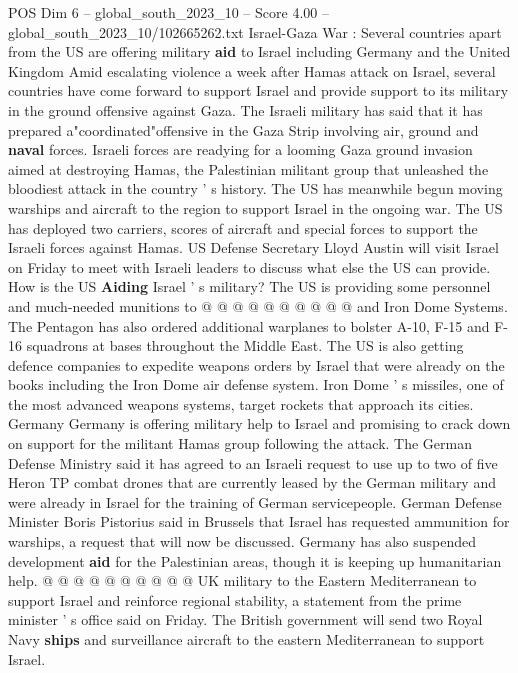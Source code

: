 \begin{textsample}{POS Dim 6 – global\_south\_2023\_10 – Score 4.00 – global\_south\_2023\_10/102665262.txt}  \label{ex:f6_pos_294}
Israel-Gaza War : Several countries apart from the US are offering military \textbf{aid} to Israel including Germany and the United Kingdom Amid escalating violence a week after Hamas attack on Israel, several countries have come forward to support Israel and provide support to its military in the ground offensive against Gaza.
The Israeli military has said that it has prepared a"coordinated"offensive in the Gaza Strip involving air, ground and \textbf{naval} forces.
Israeli forces are readying for a looming Gaza ground invasion aimed at destroying Hamas, the Palestinian militant group that unleashed the bloodiest attack in the country ' s history.
The US has meanwhile begun moving warships and aircraft to the region to support Israel in the ongoing war.
The US has deployed two carriers, scores of aircraft and special forces to support the Israeli forces against Hamas.
US Defense Secretary Lloyd Austin will visit Israel on Friday to meet with Israeli leaders to discuss what else the US can provide.
How is the US \textbf{Aiding} Israel ' s military?
The US is providing some personnel and much-needed munitions to @ @ @ @ @ @ @ @ @ @ and Iron Dome Systems.
The Pentagon has also ordered additional warplanes to bolster A-10, F-15 and F-16 squadrons at bases throughout the Middle East.
The US is also getting defence companies to expedite weapons orders by Israel that were already on the books including the Iron Dome air defense system.
Iron Dome ' s missiles, one of the most advanced weapons systems, target rockets that approach its cities.
Germany Germany is offering military help to Israel and promising to crack down on support for the militant Hamas group following the attack.
The German Defense Ministry said it has agreed to an Israeli request to use up to two of five Heron TP combat drones that are currently leased by the German military and were already in Israel for the training of German servicepeople.
German Defense Minister Boris Pistorius said in Brussels that Israel has requested ammunition for warships, a request that will now be discussed.
Germany has also suspended development \textbf{aid} for the Palestinian areas, though it is keeping up humanitarian help. @ @ @ @ @ @ @ @ @ @ UK military to the Eastern Mediterranean to support Israel and reinforce regional stability, a statement from the prime minister ' s office said on Friday.
The British government will send two Royal Navy \textbf{ships} and surveillance aircraft to the eastern Mediterranean to support Israel.

\end{textsample}
